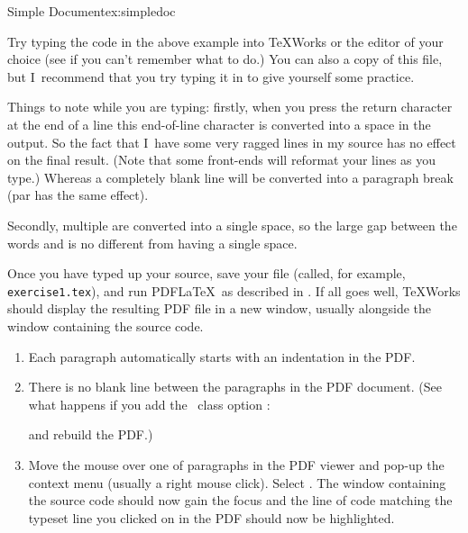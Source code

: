 \begin{exercise}{Simple Document}{ex:simpledoc}

Try typing the code in the above example into TeXWorks or the editor
of your choice (see  if
you can't remember what to do.) You can also  a
copy of this file, but I~recommend that you try typing it in to give
yourself some practice.

Things to note while you are typing: firstly, when you press the
return character at the end of a line this end-of-line character is
converted into a space in the \gls{output}.  So the
fact that I~have some very ragged lines in my \gls{source} has
no effect on the final result. (Note that some front-ends will 
reformat your lines as you type.) Whereas a completely blank line
will be converted into a paragraph break (\gls{par} has the same
effect).

Secondly, multiple  are converted into a single space,
so the large gap between the words  and  is
no different from having a single space.

Once you have typed up your \gls{source}, save your file 
(called, for example, \texttt{exercise1.tex}), and run PDF\LaTeX\ as described in 
. If all goes well, TeXWorks should display
the resulting PDF file in a new window, usually alongside the window
containing the source code.

\begin{enumerate}

\item Each paragraph automatically starts with an indentation in the
PDF.

\item There is no blank line between the paragraphs in the PDF
document. (See what happens if you add the \koma\ class option
:
\begin{codeS}
\end{codeS}
and rebuild the PDF.)

\item Move the mouse over one of paragraphs in the PDF viewer and
pop-up the context menu (usually a right mouse click). Select
. The window containing the source code should
now gain the focus and the line of code matching the typeset line you clicked on
in the PDF should now be highlighted.

\end{enumerate}

\end{exercise}

